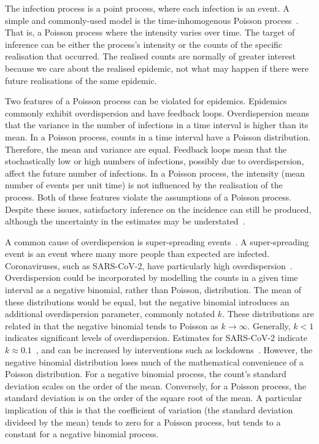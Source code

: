 \documentclass[thesis.tex]{subfiles}
\begin{document}
The infection process is a point process, where each infection is an event.
A simple and commonly-used model is the time-inhomogenous Poisson process~\autocites{brookmeyerMethod}{paganoHIV}{rosenbergBackcalculation}{brookmeyerBackcalculation}.
That is, a Poisson process where the intensity varies over time.
The target of inference can be either the process's intensity or the counts of the specific realisation that occurred.
The realised counts are normally of greater interest because we care about the realised epidemic, not what may happen if there were future realisations of the same epidemic.

Two features of a Poisson process can be violated for epidemics.
Epidemics commonly exhibit overdispersion and have feedback loops.
Overdispersion means that the variance in the number of infections in a time interval is higher than its mean.
In a Poisson process, counts in a time interval have a Poisson distribution.
Therefore, the mean and variance are equal.
Feedback loops mean that the stochastically low or high numbers of infections, possibly due to overdispersion, affect the future number of infections.
In a Poisson process, the intensity (mean number of events per unit time) is not influenced by the realisation of the process.
Both of these features violate the assumptions of a Poisson process.
Despite these issues, satisfactory inference on the incidence can still be produced, although the uncertainty in the estimates may be understated~\autocite{beckerDependent}.

A common cause of overdispersion is super-spreading events~\autocite{lloyd-smithSuperspreading}.
A super-spreading event is an event where many more people than expected are infected.
Coronaviruses, such as SARS-CoV-2, have particularly high overdispersion~\autocites{endoEstimating}{adamClustering}{mccloskeySARS}.
Overdispersion could be incorporated by modelling the counts in a given time interval as a negative binomial, rather than Poisson, distribution.
The mean of these distributions would be equal, but the negative binomial introduces an additional overdispersion parameter, commonly notated $k$.
These distributions are related in that the negative binomial tends to Poisson as $k\to\infty$.
Generally, $k<1$ indicates significant levels of overdispersion.
Estimates for SARS-CoV-2 indicate $k \approx 0.1$~\autocite{endoEstimating}, and can be increased by interventions such as lockdowns~\autocites{quiltyReconstructing}{quiltyUnderstanding}.
However, the negative binomial distribution loses much of the mathematical convenience of a Poisson distribution.
For a negative binomial process, the count's standard deviation scales on the order of the mean.
Conversely, for a Poisson process, the standard deviation is on the order of the square root of the mean.
A particular implication of this is that the coefficient of variation (the standard deviation divideed by the mean) tends to zero for a Poisson process, but tends to a constant for a negative binomial process.
\end{document}

